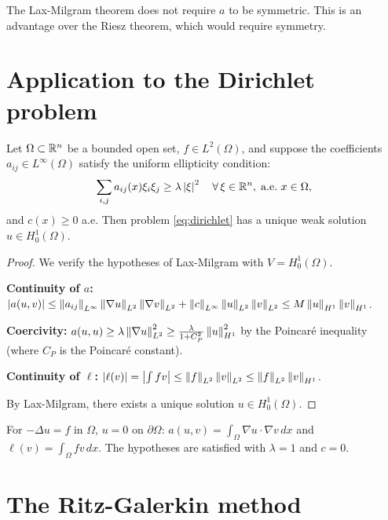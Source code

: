 \begin{warning}[title=\textbf{Symmetry not required}]
The Lax-Milgram theorem does not require $a$ to be symmetric. This is an advantage
over the Riesz theorem, which would require symmetry.
\end{warning}

\section{Application to the Dirichlet problem}

\begin{theorem}
\label{thm:dirichlet}
Let $\Omega \subset \mathbb{R}^n$ be a bounded open set, $f \in L^2(\Omega)$, and suppose
the coefficients $a_{ij} \in L^\infty(\Omega)$ satisfy the uniform ellipticity
condition:
\[
    \sum_{i,j} a_{ij}(x) \xi_i \xi_j \geq \lambda \left| \xi \right|^2
    \quad \forall\, \xi \in \mathbb{R}^n,\; \text{a.e.\ } x \in \Omega,
\]
and $c(x) \geq 0$ a.e. Then problem \eqref{eq:dirichlet} has a unique weak
solution $u \in H_0^1(\Omega)$.
\end{theorem}

\begin{proof}
We verify the hypotheses of Lax-Milgram with $V = H_0^1(\Omega)$.

\textbf{Continuity of $a$:}
$\left| a(u,v) \right| \leq \left\| a_{ij} \right\|_{L^\infty} \left\| \nabla u \right\|_{L^2} \left\| \nabla v \right\|_{L^2}
+ \left\| c \right\|_{L^\infty} \left\| u \right\|_{L^2} \left\| v \right\|_{L^2} \leq M \left\| u \right\|_{H^1} \left\| v \right\|_{H^1}$.

\textbf{Coercivity:}
$a(u,u) \geq \lambda \left\| \nabla u \right\|_{L^2}^2 \geq \frac{\lambda}{1 + C_P^2} \left\| u \right\|_{H^1}^2$
by the Poincar\'e inequality (where $C_P$ is the Poincar\'e constant).

\textbf{Continuity of $\ell$:}
$\left| \ell(v) \right| = \left| \int f v \right| \leq \left\| f \right\|_{L^2}\left\| v \right\|_{L^2}
\leq \left\| f \right\|_{L^2}\left\| v \right\|_{H^1}$.

By Lax-Milgram, there exists a unique solution $u \in H_0^1(\Omega)$.
\end{proof}

\begin{example}
For $-\Delta u = f$ in $\Omega$, $u = 0$ on $\partial\Omega$:
$a(u,v) = \int_\Omega \nabla u \cdot \nabla v\, dx$ and $\ell(v) = \int_\Omega fv\, dx$.
The hypotheses are satisfied with $\lambda = 1$ and $c = 0$.
\end{example}

\section{The Ritz-Galerkin method}

